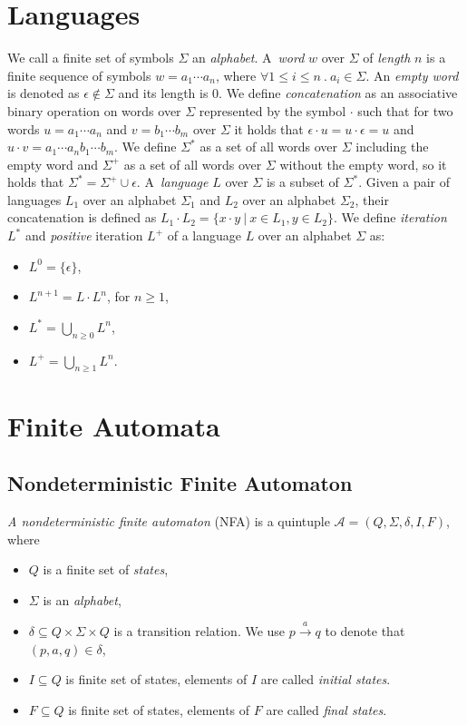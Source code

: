 \section{Languages}
We call a finite set of symbols $\Sigma$ an \emph{alphabet}. A~\emph{word} $w$ over $\Sigma$ of \emph{length} $n$ is a finite sequence of symbols 
$w=a_1\cdots a_n$, where $\forall 1 \leq i \leq n\ . \ a_i \in \Sigma$. An \emph{empty word} is denoted as $\epsilon \not\in\Sigma$ and its length is $0$. 
We define \emph{concatenation} as an associative binary operation on words over $\Sigma$ represented by the symbol $\cdot$ such that for two words 
$u=a_1\cdots a_n$
and $v=b_1\cdots b_m$ over $\Sigma$ it holds that $\epsilon\cdot u=u\cdot\epsilon=u$ and $u\cdot v=a_1 \cdots a_nb_1 \cdots b_m$.
We define $\Sigma^{*}$ as a set of all words over $\Sigma$ including the empty word and $\Sigma^{+}$ as a set of 
all words over $\Sigma$ without the empty word, 
so it holds that $\Sigma^{*}=\Sigma^{+}\cup\epsilon$. A~\emph{language} $L$ over $\Sigma$ is a subset of $\Sigma^{*}$.
Given a pair of languages $L_1$ over an alphabet $\Sigma_{1}$ and $L_{2}$ over an alphabet $\Sigma_{2}$, their concatenation is defined as 
$L_1\cdot L_2=\{x\cdot y\ |\ x\in L_1, y\in L_2 \}$.
We define \emph{iteration} $L^{*}$ and \emph{positive} iteration $L^{+}$ of a language $L$ over an alphabet $\Sigma$ as:
	\begin{itemize}
		\item $L^0=\{\epsilon\}$,
		\item $L^{n+1}=L\cdot L^n$, for $n \geq 1$,
    \item $L^{*}=\bigcup_{n\geq 0} L^{n}$,
    \item $L^{+}=\bigcup_{n\geq 1} L^{n}$.
	\end{itemize}

\section{Finite Automata}
\label{defFA}

	\subsection{Nondeterministic Finite Automaton}
	\label{defNFA}
		\emph{A nondeterministic finite automaton} (NFA) is a quintuple $\mathcal{A}=(Q,\Sigma,\delta,I,F)$, where
		\begin{itemize}
			\item $Q$ is a finite set of \emph{states},
			\item $\Sigma$ is an \emph{alphabet},
			\item $\delta \subseteq Q \times \Sigma \times Q$ is a transition relation. We use $p \xrightarrow{a} q$ to denote that $(p,a,q)\in\delta$,
			\item $I\subseteq Q$ is finite set of states, elements of $I$ are called \emph{initial states}.
			\item $F\subseteq Q$ is finite set of states, elements of $F$ are called \emph{final states}.
		\end{itemize}

